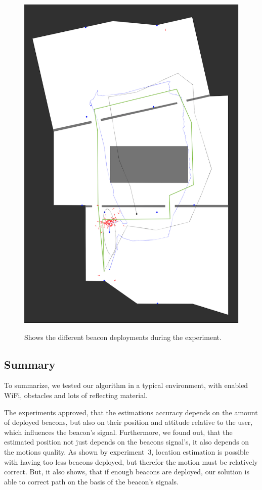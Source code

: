 \begin{figure}
{		\includegraphics[height=0.45\textheight]{figures/eval_3_6}
		\label{fig:exp2_imgs_6}
	}
	\caption{Shows the different beacon deployments during the experiment.}
\end{figure}


\subsection*{Summary}
To summarize, we tested our algorithm in a typical environment, with enabled WiFi, obstacles and lots of reflecting material.

The experiments approved, that the estimations accuracy depends on the amount of deployed beacons, but also on their position and attitude relative to the user, which influences the beacon's signal. Furthermore, we found out, that the estimated position not just depends on the beacons signal's, it also depends on the motions quality. As shown by experiment~3, location estimation is possible with having too less beacons deployed, but therefor the motion must be relatively correct. But, it also shows, that if enough beacons are deployed, our solution is able to correct path on the basis of the beacon's signals.

